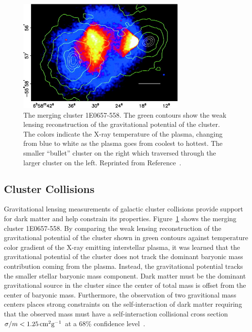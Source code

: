 \begin{figure}[htbp]
  \centering
  \includegraphics[width=0.75\textwidth]{DarkMatter/Figures/bullet_cluster.jpg}
  \caption{
    The merging cluster 1E0657-558.
    The green contours show the weak lensing reconstruction of the gravitational potential of the cluster.
    The colors indicate the X-ray temperature of the plasma, changing from blue to white as the plasma goes from coolest to hottest.
    The smaller ``bullet'' cluster on the right which traversed through the larger cluster on the left.
    Reprinted from Reference~\cite{Clowe2006}.
  }
  \label{fig:bullet_cluster}
\end{figure}

\subsection{Cluster Collisions}
\label{sec:dm_bullet}

Gravitational lensing measurements of galactic cluster collisions provide support for dark matter and help constrain its properties.
Figure~\ref{fig:bullet_cluster} shows the merging cluster 1E0657-558.
By comparing the weak lensing reconstruction of the gravitational potential of the cluster shown in green contours against temperature color gradient of the X-ray emitting interstellar plasma, it was learned that the gravitational potential of the cluster does not track the dominant baryonic mass contribution coming from the plasma.
Instead, the gravitational potential tracks the smaller stellar baryonic mass component.
Dark matter must be the dominant gravitational source in the cluster since the center of total mass is offset from the center of baryonic mass.
Furthermore, the observation of two gravitional mass centers places strong constraints on the self-interaction of dark matter requiring that the observed mass must have a self-interaction collisional cross section $\sigma/m < 1.25\,\text{cm}^2\text{g}^{-1}$ at a 68\% confidence level~\cite{Clowe2006}.

